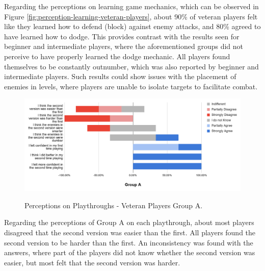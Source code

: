 Regarding the perceptions on learning game mechanics, which can be observed in Figure \ref{fig:perception-learning-veteran-players}, about 90\% of veteran players felt like they learned how to defend (block) against enemy attacks, and 80\% agreed to have learned how to dodge. This provides contrast with the results seen for beginner and intermediate players, where the aforementioned groups did not perceive to have properly learned the dodge mechanic. All players found themselves to be constantly outnumber, which was also reported by beginner and intermediate players. Such results could show issues with the placement of enemies in levels, where players are unable to isolate targets to facilitate combat.

\begin{figure}[!ht]
    \begin{center}
    \caption{Perceptions on Playthroughs - Veteran Players Group A.}
        \includegraphics[width=36em]{figures/fig-perception-versions-veteran-players-group-a.png}
        \label{fig:perception-playthrough-veteran-players-group-a}
    \end{center}
\end{figure}

Regarding the perceptions of Group A on each playthrough, about most players disagreed that the second version was easier than the first. All players found the second version to be harder than the first. An inconsistency was found with the answers, where part of the players did not know whether the second version was easier, but most felt that the second version was harder.

